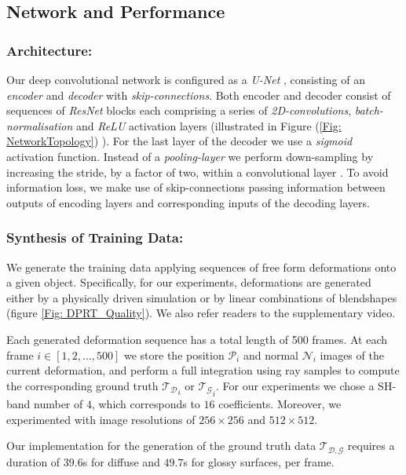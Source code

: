 \subsection{Network and Performance }
\subsubsection*{Architecture: \\} 
Our deep convolutional network is configured as a \textit{U-Net}  \cite{U-Net}, consisting of an \textit{encoder} and \textit{decoder} with \textit{skip-connections}. Both encoder and decoder consist of sequences of \textit{ResNet} blocks \cite{ResNet} each comprising a series of \textit{2D-convolutions}, \textit{batch-normalisation} and \textit{ReLU} activation layers (illustrated in Figure (\ref{Fig: NetworkTopology}) ). For the last layer of the decoder we use a \textit{sigmoid} activation function. Instead of a \textit{pooling-layer} we perform down-sampling by increasing the stride, by a factor of two, within a convolutional layer \cite{StridingConv}. To avoid information loss,  we make use of skip-connections passing information between outputs of encoding layers and corresponding inputs of the decoding layers.

\subsubsection*{Synthesis of Training Data:\\}
We generate the training data applying sequences of free form deformations onto a given object. Specifically, for our experiments, deformations are generated either by a physically driven simulation or by linear combinations of blendshapes (figure \ref{Fig: DPRT_Quality}). We also refer readers to the supplementary video. 

Each generated deformation sequence has a total length of 500 frames. 
At each frame $i \in [1,2,\dots,500]$ we store the position $\mathcal{P}_i$  and normal $\mathcal{N}_i$ images of the current deformation, and perform a full integration using ray samples to compute the corresponding ground truth $\mathcal{T_D}_i$ or $\mathcal{T_G}_i$. For our experiments we chose a SH-band number of $4$, which corresponds to $16$ coefficients. Moreover, we experimented with image resolutions of $256 \times 256$ and $512 \times 512$. 

Our implementation for the generation of the ground truth data $\mathcal{T_{D,G}}$ requires a duration of $39.6$s for diffuse and $49.7$s for glossy surfaces, per frame.

